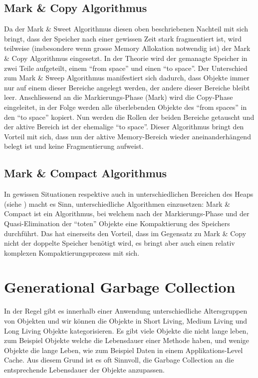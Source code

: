 \subsection{Mark \& Copy Algorithmus\cite{langerkreft201005}}
Da der Mark \& Sweet Algorithmus diesen oben beschriebenen Nachteil mit sich bringt, dass der Speicher nach einer gewissen Zeit stark fragmentiert ist, wird teilweise (insbesondere wenn grosse Memory Allokation notwendig ist) der Mark \& Copy Algorithmus eingesetzt. In der Theorie wird der gemanagte Speicher in zwei Teile aufgeteilt, einem ``from space'' und einen ``to space''. Der Unterschied zum Mark \& Sweep Algorithmus manifestiert sich dadurch, dass Objekte immer nur auf einem dieser Bereiche angelegt werden, der andere dieser Bereiche bleibt leer. Anschliessend an die Markierungs-Phase (Mark) wird die Copy-Phase eingeleitet, in der Folge werden alle überlebenden Objekte des ``from spaces'' in den ``to space'' kopiert. Nun werden die Rollen der beiden Bereiche getauscht und der aktive Bereich ist der ehemalige ``to space''. Dieser Algorithmus bringt den Vorteil mit sich, dass nun der aktive Memory-Bereich wieder aneinanderhängend belegt ist und keine Fragmentierung aufweist.

\subsection{Mark \& Compact Algorithmus\cite{langerkreft201007}}
In gewissen Situationen respektive auch in unterschiedlichen Bereichen des Heaps (siehe ) macht es Sinn, unterschiedliche Algorithmen einzusetzen: Mark \& Compact ist ein Algorithmus, bei welchem nach der Markierungs-Phase und der Quasi-Elimination der ``toten'' Objekte eine Kompaktierung des Speichers durchführt. Das hat einerseits den Vorteil, dass im Gegensatz zu Mark \& Copy nicht der doppelte Speicher benötigt wird, es bringt aber auch einen relativ komplexen Kompaktierungsprozess mit sich.

\section{Generational Garbage Collection}\label{generational gc}
In der Regel gibt es innerhalb einer Anwendung unterschiedliche Altersgruppen von Objekten und wir können die Objekte in Short Living, Medium Living und Long Living Objekte kategorisieren. Es gibt viele Objekte die nicht lange leben, zum Beispiel Objekte welche die Lebensdauer einer Methode haben, und wenige Objekte die lange Leben, wie zum Beispiel Daten in einem Applikations-Level Cache. Aus diesem Grund ist es oft Sinnvoll, die Garbage Collection an die entsprechende Lebensdauer der Objekte anzupassen. 

